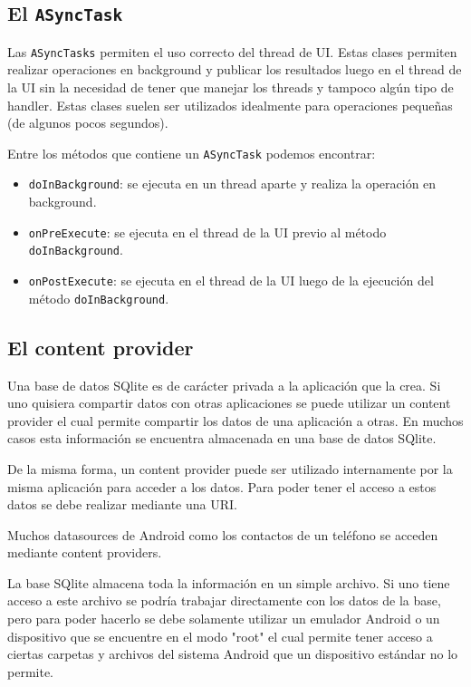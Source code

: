 \subsection{El \texttt{ASyncTask}}
\label{subsec:dev.asynctask}

Las \texttt{ASyncTasks} permiten el uso correcto del thread de \ac{UI}. Estas clases permiten realizar operaciones en background y publicar los resultados luego en el thread de la \ac{UI} sin la necesidad de tener que manejar los threads y tampoco alg\'un tipo de handler. Estas clases suelen ser utilizados idealmente para operaciones peque\~nas (de algunos pocos segundos).

Entre los m\'etodos que contiene un \texttt{ASyncTask} podemos encontrar:

\begin{itemize}
\item \texttt{doInBackground}: se ejecuta en un thread aparte y realiza la operaci\'on en background.
\item \texttt{onPreExecute}: se ejecuta en el thread de la \ac{UI} previo al m\'etodo \texttt{doInBackground}.
\item \texttt{onPostExecute}: se ejecuta en el thread de la \ac{UI} luego de la ejecuci\'on del m\'etodo \texttt{doInBackground}.
\end{itemize}

\subsection{El content provider}
\label{subsec:dev.contentProvider}

Una base de datos SQlite es de car\'acter privada a la aplicaci\'on que la crea. Si uno quisiera compartir datos con otras aplicaciones se puede utilizar un content provider el cual permite compartir los datos de una aplicaci\'on a otras. En muchos casos esta informaci\'on se encuentra almacenada en una base de datos SQlite.

De la misma forma, un content provider puede ser utilizado internamente por la misma aplicaci\'on para acceder a los datos. Para poder tener el acceso a estos datos se debe realizar mediante una \ac{URI}.

Muchos datasources de Android como los contactos de un tel\'efono se acceden mediante content providers.

La base SQlite almacena toda la informaci\'on en un simple archivo. Si uno tiene acceso a este archivo se podr\'ia trabajar directamente con los datos de la base, pero para poder hacerlo se debe solamente utilizar un emulador Android o un dispositivo que se encuentre en el modo "root" el cual permite tener acceso a ciertas carpetas y archivos del sistema Android que un dispositivo est\'andar no lo permite.

